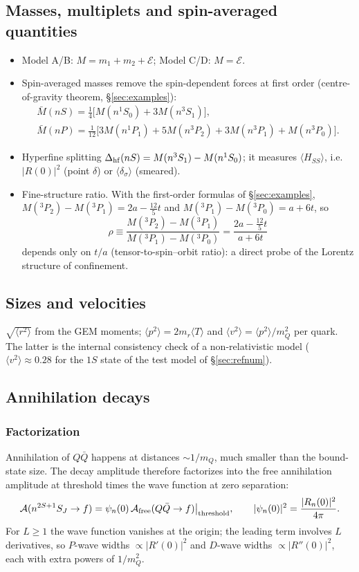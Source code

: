 \documentclass[11pt,a4paper]{article}
\numberwithin{equation}{section}
\theoremstyle{definition}
\theoremstyle{plain}
\theoremstyle{remark}
\numberwithin{algorithm}{section}
\newcommand{\mr}{m_r}
\begin{document}
\subsection{Masses, multiplets and spin-averaged quantities}
\begin{itemize}[leftmargin=1.3em,itemsep=2pt]
\item Model A/B: $M=m_1+m_2+\mathcal E$; Model C/D: $M=\mathcal E$.
\item Spin-averaged masses remove the spin-dependent forces at first order (centre-of-gravity theorem, \S\ref{sec:examples}):
\begin{gather}
\bar M(nS)=\tfrac14\big[M(n^1S_0)+3M(n^3S_1)\big],\\
\bar M(nP)=\tfrac1{12}\big[3M(n^1P_1)+5M(n^3P_2)+3M(n^3P_1)+M(n^3P_0)\big].
\end{gather}
\item Hyperfine splitting $\Delta_{\rm hf}(nS)=M(n^3S_1)-M(n^1S_0)$; it measures $\langle H_{SS}\rangle$, i.e.\ $|R(0)|^2$ (point $\delta$) or $\langle\delta_\sigma\rangle$ (smeared).
\item Fine-structure ratio. With the first-order formulas of \S\ref{sec:examples}, $M({}^3P_2)-M({}^3P_1)=2a-\frac{12}5t$ and $M({}^3P_1)-M({}^3P_0)=a+6t$, so
\begin{equation}
\rho\equiv\frac{M({}^3P_2)-M({}^3P_1)}{M({}^3P_1)-M({}^3P_0)}=\frac{2a-\frac{12}{5}t}{a+6t}
\end{equation}
depends only on $t/a$ (tensor-to-spin--orbit ratio): a direct probe of the Lorentz structure of confinement.
\end{itemize}

\subsection{Sizes and velocities}
$\sqrt{\langle r^2\rangle}$ from the GEM moments; $\langle p^2\rangle=2\mr\langle T\rangle$ and $\langle v^2\rangle=\langle p^2\rangle/m_Q^2$ per quark. The latter is the internal consistency check of a non-relativistic model ($\langle v^2\rangle\approx0.28$ for the $1S$ state of the test model of \S\ref{sec:refnum}).

\subsection{Annihilation decays}
\subsubsection{Factorization}
Annihilation of $Q\bar Q$ happens at distances $\sim1/m_Q$, much smaller than the bound-state size. The decay amplitude therefore factorizes into the free annihilation amplitude at threshold times the wave function at zero separation:
\begin{equation}
\mathcal A(n^{2S+1}S_J\to f)=\psi_n(0)\,\mathcal A_{\rm free}(Q\bar Q\to f)\big|_{\rm threshold},\qquad |\psi_n(0)|^2=\frac{|R_n(0)|^2}{4\pi}.
\end{equation}
For $L\ge1$ the wave function vanishes at the origin; the leading term involves $L$ derivatives, so $P$-wave widths $\propto|R'(0)|^2$ and $D$-wave widths $\propto|R''(0)|^2$, each with extra powers of $1/m_Q^2$.
\end{document}
